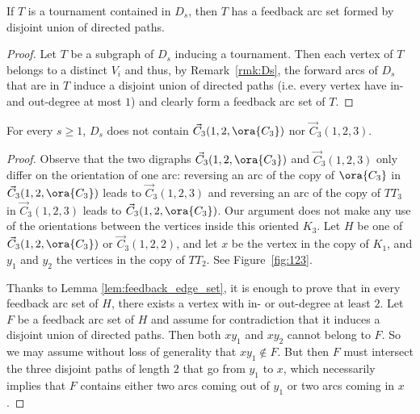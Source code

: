 \begin{lemma}\label{lem:feedback_edge_set}
If $T$ is a tournament contained in $D_s$, then $T$ has a feedback arc set formed by disjoint union of directed paths. 
\end{lemma}

\begin{proof}
Let $T$ be a subgraph of $D_s$ inducing a tournament. Then each vertex of $T$ belongs to a distinct $V_i$ and thus, by Remark~\ref{rmk:Ds}, the forward arcs of $D_s$ that are in $T$ induce a disjoint union of directed paths (i.e. every vertex have in- and out-degree at most $1$) and clearly form a feedback arc set of $T$. 
\end{proof}


\begin{lemma}\label{lem:123}
For every $s \geq 1$, $D_s$ does not contain  $\vec C_{3}(1, 2, \ora{C_3})$ nor $\vec C_{3}(1, 2, 3)$. 
\end{lemma}

\begin{proof}
Observe that the two digraphs $\vec C_{3}(1, 2, \ora{C_3})$ and $\vec C_{3}(1, 2, 3)$ only differ on the orientation of one arc: reversing an arc of the copy of $\ora{C_3}$ in $\vec C_{3}(1,2, \ora{C_3})$ leads to $\vec C_{3}(1,2, 3)$ and reversing an arc of the copy of $TT_3$ in $\vec C_{3}(1,2,3)$ leads to $\vec C_{3}(1,2, \ora{C_3})$. 
Our argument does not make any use of the orientations between the vertices inside this oriented $K_3$. Let $H$ be one of $\vec C_{3}(1, 2, \ora{C_3})$ or $\vec C_{3}(1, 2, 2)$, and let $x$ be the vertex in the copy of $K_1$, and  $y_1$ and $y_2$ the vertices in the copy of $TT_2$. See Figure~\ref{fig:123}.


Thanks to Lemma \ref{lem:feedback_edge_set}, it is enough to prove that in every feedback arc set of $H$, there exists a vertex with in- or out-degree at least $2$. Let $F$ be a feedback arc set of $H$ and assume for contradiction that it induces a disjoint union of directed paths. Then both $xy_1$ and $xy_2$ cannot belong to $F$. So we may assume without loss of generality that $xy_1 \notin F$. But then $F$ must intersect the three disjoint paths of length $2$ that go from $y_1$ to $x$, which necessarily implies that $F$ contains either two arcs coming out of $y_1$ or two arcs coming in $x$.
\end{proof}


